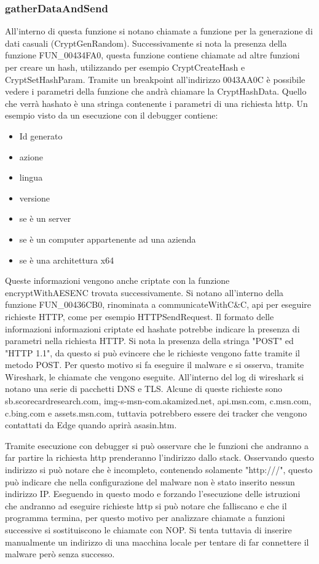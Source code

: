 \documentclass[a4paper,12pt]{article}
\begin{document}
\subsubsection{gatherDataAndSend}
All'interno di questa funzione si notano chiamate a funzione per la generazione di dati casuali (CryptGenRandom). Successivamente si nota la presenza della funzione FUN\_00434FA0, questa funzione contiene chiamate ad altre funzioni per creare un hash, utilizzando per esempio CryptCreateHash e CryptSetHashParam. Tramite un breakpoint all'indirizzo 0043AA0C è possibile vedere i parametri della funzione che andrà chiamare la CryptHashData. Quello che verrà hashato è una stringa contenente i parametri di una richiesta http. Un esempio visto da un esecuzione con il debugger contiene:
\begin{itemize}
	\item Id generato
	\item azione
	\item lingua
	\item versione
	\item se è un server
	\item se è un computer appartenente ad una azienda
	\item se è una architettura x64
\end{itemize}

Queste informazioni vengono anche criptate con la funzione encryptWithAESENC trovata successivamente.
Si notano all'interno della funzione FUN\_00436CB0, rinominata a communicateWithC\&C, api per eseguire richieste HTTP, come per esempio HTTPSendRequest. Il formato delle informazioni informazioni criptate ed hashate potrebbe indicare la presenza di parametri nella richiesta HTTP. Si nota la presenza della stringa "POST" ed "HTTP 1.1", da questo si può evincere che le richieste vengono fatte tramite il metodo POST.
Per questo motivo si fa eseguire il malware e si osserva, tramite Wireshark, le chiamate che vengono eseguite. All'interno del log di wireshark si notano una serie di pacchetti DNS e TLS.  Alcune di queste richieste sono sb.scorecardresearch.com, img-s-msn-com.akamized.net, api.msn.com, c.msn.com, c.bing.com e assets.msn.com, tuttavia potrebbero essere dei tracker che vengono contattati da Edge quando aprirà asasin.htm. 

Tramite esecuzione con debugger si può osservare  che le funzioni che andranno a far partire la richiesta http prenderanno l'indirizzo dallo stack. Osservando questo indirizzo si può notare che è incompleto, contenendo solamente "http:///", questo può indicare che nella configurazione del malware non è stato inserito nessun indirizzo IP. Eseguendo in questo modo e forzando l'esecuzione delle istruzioni che andranno ad eseguire richieste http si può notare che falliscano e che il programma termina, per questo motivo per analizzare chiamate a funzioni successive si sostituiscono le chiamate con NOP. 
Si tenta tuttavia di inserire manualmente un indirizzo di una macchina locale per tentare di far connettere il malware però senza successo. 
\end{document}
